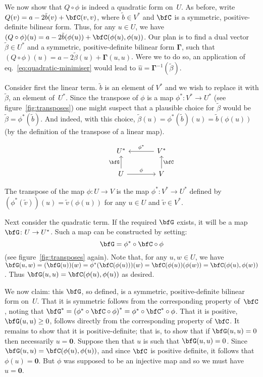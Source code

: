 \documentclass[10pt, a4paper]{article}
\newcommand{\bzero}{\mathbold{0}} %
\begin{document}
We now show that $Q\circ\phi$ is indeed a quadratic form on~$U$. As before,
write $Q(v)=a -2\tilde{b}(v) + \bfC(v,v)$, where $\tilde{b}\in V^*$ and
$\bfC$ is a symmetric, positive-definite bilinear form. Thus, for any
$u\in U$, we have
$(Q\circ\phi)(u) = a -2\tilde{b}(\phi(u)) + \bfC(\phi(u), \phi(u))$. Our plan is to
find a dual vector $\tilde{\beta}\in U^*$ and a symmetric, positive-definite
bilinear form $\bm{\Gamma}$, such that
$(Q\circ\phi)(u)=a -2\tilde{\beta}(u) + \bm{\Gamma}(u,u)$. Were we to do so, an
application of eq.~\eqref{eq:quadratic-minimiser} would lead to
$\hat{u}=\bm{\Gamma}^{-1}(\tilde{\beta})$.

Consider first the linear term. $\tilde{b}$ is an element of $V^*$ and
we wish to replace it with $\tilde{\beta}$, an element of~$U^*$. Since the
transpose of $\phi$ is a map $\phi^*\colon V^*\to U^*$ (see
figure~\ref{fig:transposes}) one might suspect that a plausible choice
for $\tilde{\beta}$ would be $\tilde{\beta}=\phi^*(\tilde{b})$. And indeed, with
this choice,
$\tilde{\beta}(u) = \phi^*(\tilde{b})(u)= \tilde{b}(\phi(u))$ (by the
definition of the transpose of a linear map).
\begin{marginfigure}
  \[\begin{tikzcd}[column sep=large]
      & U^*  & V^* \arrow[l, "\phi^*"'] \\
      & U \arrow[u, "\bfG"] \arrow[r, "\phi"] & V \arrow[u,
      "\bfC"'] 
    \end{tikzcd}\]
  \caption{The transpose of the map $\phi\colon U\to V$ is the map
    $\phi^*\colon V^*\to U^*$ defined by
    $(\phi^*(\tilde{v}))(u) = \tilde{v}(\phi(u))$ for any $u\in U$ and
    $\tilde{v}\in V^*$. \label{fig:transposes}}
\end{marginfigure} 

Next consider the quadratic term. If the required $\bfG$ exists, it
will be a map $\bfG\colon U\to U^*$. Such a map can be constructed by
setting:
\[
  \bfG = \phi^*\circ \bfC \circ \phi
\]
(see figure~\ref{fig:transposes} again). Note that, for any
$u,w\in U$, we have
$\bfG(u,w) = (\bfG(u))(w) = \phi^*(\bfC(\phi(u)))(w) = \bfC(\phi(u))(\phi(w)) =
\bfC(\phi(u), \phi(w))$. Thus $\bfG(u,u)=\bfC(\phi(u), \phi(u))$ as desired.

We now claim: this $\bfG$, so defined, is a symmetric,
positive-definite bilinear form on~$U$. That it is symmetric follows
from the corresponding property of~$\bfC$, noting that
$\bfG^* = {(\phi^*\circ \bfC \circ \phi)}^* = \phi^*\circ \bfC^* \circ \phi$. That it is positive,
$\bfG(u,u)\geq 0$, follows directly from the corresponding property of
$\bfC$. It remains to show that it is positive-definite; that is, to
show that if $\bfG(u,u)=0$ then necessarily $u=\bzero$. Suppose then that
$u$ is such that $\bfG(u,u)=0$. Since
$\bfG(u,u) = \bfC(\phi(u),\phi(u))$, and since $\bfC$ is positive definite,
it follows that $\phi(u)=\bzero$. But $\phi$ was supposed to be an injective map
and so we must have $u=\bzero$.
\end{document}
